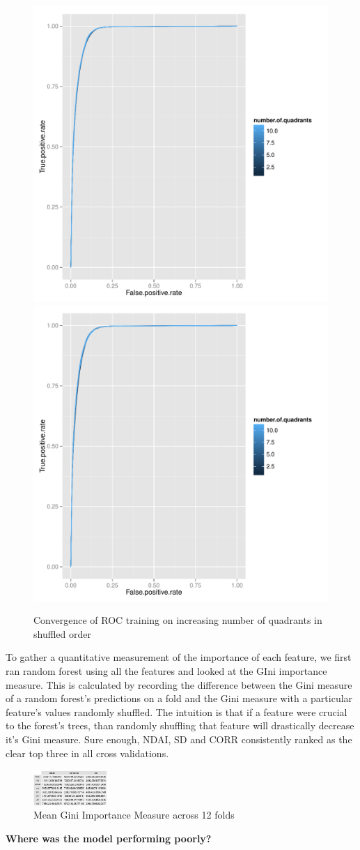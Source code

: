 \documentclass{article}\usepackage[]{graphicx}\usepackage[]{color}
\begin{document}
  \begin{figure}[H]
  \includegraphics[width=\linewidth, height = 180pts ]{ROC_converge_shuffle1.pdf}
\endminipage\hfill
{}
  \includegraphics[width=\linewidth, height = 180pts]{ROC_converge_shuffle2.pdf}
\endminipage\hfill
  \caption{Convergence of ROC training on increasing number of quadrants in shuffled order}\label{}
\end{figure}
  
To gather a quantitative measurement of the importance of each feature, we first ran random forest using all the features and looked at the GIni importance measure.  This is calculated by recording the difference between the Gini measure of a random forest's predictions on a fold and the Gini measure with a particular feature's values randomly shuffled.  The intuition is that if a feature were crucial to the forest's trees, than randomly shuffling that feature will drastically decrease it's Gini measure.  Sure enough, NDAI, SD and CORR   consistently ranked as the clear top three in all cross validations. \\
\begin{figure}
\centering
\includegraphics[width=0.25\textwidth]{Gini_mean_sd.png}
\caption{Mean Gini Importance Measure across 12 folds}
\end{figure}
{\bf Where was the model performing poorly?}
\end{document}
